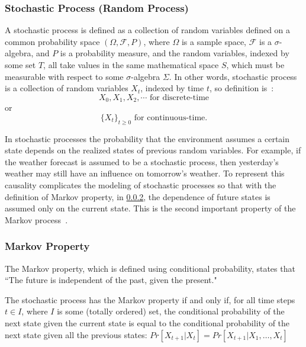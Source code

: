 \documentclass[../xlapes02]{subfiles}
\begin{document}
    \subsubsection{Stochastic Process (Random Process)}\label{subsubsec:stochastic-process}
    A stochastic process is defined as a collection of random variables defined on a common probability space $(\Omega, \mathcal{F}, P)$, where $\Omega$ is a sample space, $\mathcal{F}$ is a $\sigma$-algebra, and $P$ is a probability measure, and the random variables, indexed by some set $T$, all take values in the same mathematical space $S$, which must be measurable with respect to some $\sigma$-algebra $\Sigma$. In other words, stochastic process is a collection of random variables $X_t$, indexed by time $t$, so definition is~\cite{enwiki:1148510872}:
    \begin{equation}
        X_0, X_1, X_2,\cdots \text{ for discrete-time}
    \end{equation}
    or
    \begin{equation}
        \{X_t\}_{t\geq0} \text{ for continuous-time.}
    \end{equation}

    In stochastic processes the probability that the environment assumes a certain state depends on the realized states of previous random variables. For example, if the weather forecast is assumed to be a stochastic process, then yesterday’s weather may still have an influence on tomorrow’s weather. To represent this causality complicates the modeling of stochastic processes so that with the definition of Markov property, in \cref{subsubsec:markov-property}, the dependence of future states is assumed only on the current state. This is the second important property of the Markov process~\cite{FITMT25127}.

    \subsubsection{Markov Property}\label{subsubsec:markov-property}
    The Markov property, which is defined using conditional probability, states that ``The future is independent of the past, given the present."

    The stochastic process has the Markov property if and only if, for all time steps $t \in I$, where $I$ is some (totally ordered) set, the conditional probability of the next state given the current state is equal to the conditional probability of the next state given all the previous states: $Pr\left[X_{t+1}|X_t\right] = Pr\left[X_{t+1}|X_1,\ldots,X_t\right]$
\end{document}
